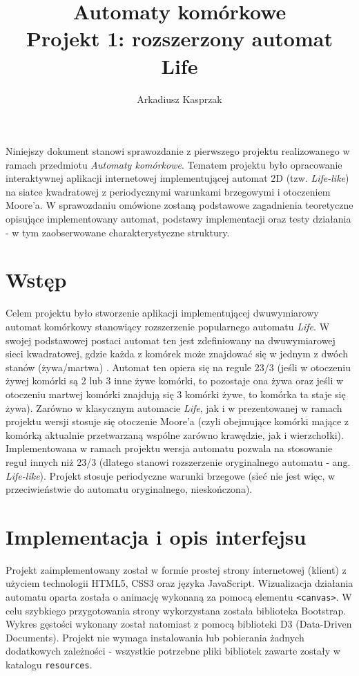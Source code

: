 \documentclass[12pt] {article}
\title {
	\large Automaty komórkowe \\
    \normalsize Projekt 1: rozszerzony automat Life
    }
\author {Arkadiusz Kasprzak}
\date{}
\renewenvironment{abstract}
 {\small
  \begin{center}
  \bfseries \abstractname\vspace{-.5em}\vspace{0pt}
  \end{center}
  \list{}{%
    \setlength{\leftmargin}{5mm}%
    \setlength{\rightmargin}{\leftmargin}%
  }%
  \item\relax}
 {\endlist}
\begin{document}
\maketitle

\begin{abstract}
Niniejszy dokument stanowi sprawozdanie z pierwszego projektu realizowanego w ramach przedmiotu \textit{Automaty komórkowe}. Tematem projektu było opracowanie interaktywnej aplikacji internetowej implementującej automat 2D (tzw. \textit{Life-like}) na siatce kwadratowej z periodycznymi warunkami brzegowymi i otoczeniem Moore'a. W sprawozdaniu omówione zostaną podstawowe zagadnienia teoretyczne opisujące implementowany automat, podstawy implementacji oraz testy działania - w tym zaobserwowane charakterystyczne struktury. 
\end{abstract}

\tableofcontents

\newpage 

\section{Wstęp}
Celem projektu było stworzenie aplikacji implementującej dwuwymiarowy automat komórkowy stanowiący rozszerzenie popularnego automatu \textit{Life}. W swojej podstawowej postaci automat ten jest zdefiniowany na dwuwymiarowej sieci kwadratowej, gdzie każda z komórek może znajdować się w jednym z dwóch stanów (żywa/martwa) \cite{malarz}. Automat ten opiera się na regule 23/3 (jeśli w otoczeniu żywej komórki są 2 lub 3 inne żywe komórki, to pozostaje ona żywa oraz jeśli w otoczeniu martwej komórki znajdują się 3 komórki żywe, to komórka ta staje się żywa). Zarówno w klasycznym automacie \textit{Life}, jak i w prezentowanej w ramach projektu wersji stosuje się otoczenie Moore'a (czyli obejmujące komórki mające z komórką aktualnie przetwarzaną wspólne zarówno krawędzie, jak i wierzchołki). Implementowana w ramach projektu wersja automatu pozwala na stosowanie reguł innych niż 23/3 (dlatego stanowi rozszerzenie oryginalnego automatu - ang. \textit{Life-like}). Projekt stosuje periodyczne warunki brzegowe (sieć nie jest więc, w przeciwieństwie do automatu oryginalnego, nieskończona).



\section{Implementacja i opis interfejsu}
Projekt zaimplementowany został w formie prostej strony internetowej (klient) z użyciem technologii HTML5, CSS3 oraz języka JavaScript. Wizualizacja działania automatu oparta została o animację wykonaną za pomocą elementu \lstinline{<canvas>}. W celu szybkiego przygotowania strony wykorzystana została biblioteka Bootstrap. Wykres gęstości wykonany został natomiast z pomocą biblioteki D3 (Data-Driven Documents). Projekt nie wymaga instalowania lub pobierania żadnych dodatkowych zależności - wszystkie potrzebne pliki bibliotek zawarte zostały w katalogu \lstinline{resources}. 
\end{document}
